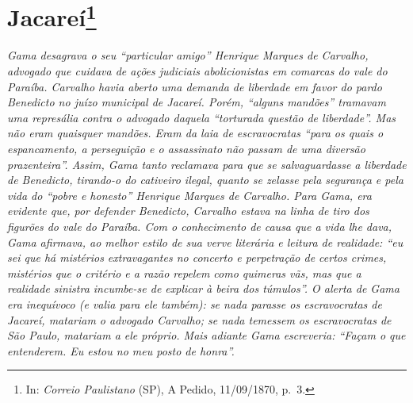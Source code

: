 {\chapter{Jacareí\footnote{ In: \emph{Correio Paulistano} (SP), A Pedido, 11/09/1870,
  p.~3.}} %

\begin{didascalia}
\emph{Gama desagrava o seu ``particular amigo'' Henrique Marques de
Carvalho, advogado que cuidava de ações judiciais abolicionistas em
comarcas do vale do Paraíba. Carvalho havia aberto uma demanda de
liberdade em favor do pardo Benedicto no juízo municipal de Jacareí.
Porém, ``alguns mandões'' tramavam uma represália contra o advogado
daquela ``torturada questão de liberdade''. Mas não eram quaisquer
mandões. Eram da laia de escravocratas ``para os quais o espancamento, a
perseguição e o assassinato não passam de uma diversão prazenteira''.
Assim, Gama tanto reclamava para que se salvaguardasse a liberdade de
Benedicto, tirando-o do cativeiro ilegal, quanto se zelasse pela
segurança e pela vida do ``pobre e honesto'' Henrique Marques de Carvalho.
Para Gama, era evidente que, por defender Benedicto, Carvalho estava na
linha de tiro dos figurões do vale do Paraíba. Com o conhecimento de
causa que a vida lhe dava, Gama afirmava, ao melhor estilo de sua verve
literária e leitura de realidade: ``eu sei que há mistérios extravagantes
no concerto e perpetração de certos crimes, mistérios que o critério e a
razão repelem como quimeras vãs, mas que a realidade sinistra incumbe-se
de explicar à beira dos túmulos''. O alerta de Gama era inequívoco (e
valia para ele também): se nada parasse os escravocratas de Jacareí,
matariam o advogado Carvalho; se nada temessem os escravocratas de São
Paulo, matariam a ele próprio. Mais adiante Gama escreveria: ``Façam o
que entenderem. Eu estou no meu posto de honra''.}
\end{didascalia}

\asterisc{}

}

